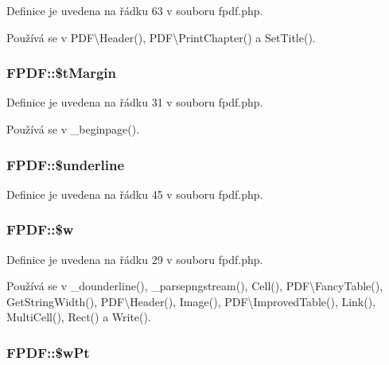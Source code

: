 Definice je uvedena na řádku 63 v souboru fpdf.\-php.



Používá se v P\-D\-F\textbackslash{}\-Header(), P\-D\-F\textbackslash{}\-Print\-Chapter() a Set\-Title().

\hypertarget{class_f_p_d_f_a89d24fb15623f31293ef11860ec53a77}{
\subsubsection[{\$t\-Margin}]{\setlength{\rightskip}{0pt plus 5cm}F\-P\-D\-F\-::\$t\-Margin}}\label{class_f_p_d_f_a89d24fb15623f31293ef11860ec53a77}


Definice je uvedena na řádku 31 v souboru fpdf.\-php.



Používá se v \-\_\-beginpage().

\hypertarget{class_f_p_d_f_a2d65d65ac5a4d1f173a2d61bfc7ca621}{
\subsubsection[{\$underline}]{\setlength{\rightskip}{0pt plus 5cm}F\-P\-D\-F\-::\$underline}}\label{class_f_p_d_f_a2d65d65ac5a4d1f173a2d61bfc7ca621}


Definice je uvedena na řádku 45 v souboru fpdf.\-php.

\hypertarget{class_f_p_d_f_adcb78dac68c4b261fab2a9c03de77177}{
\subsubsection[{\$w}]{\setlength{\rightskip}{0pt plus 5cm}F\-P\-D\-F\-::\$w}}\label{class_f_p_d_f_adcb78dac68c4b261fab2a9c03de77177}


Definice je uvedena na řádku 29 v souboru fpdf.\-php.



Používá se v \-\_\-dounderline(), \-\_\-parsepngstream(), Cell(), P\-D\-F\textbackslash{}\-Fancy\-Table(), Get\-String\-Width(), P\-D\-F\textbackslash{}\-Header(), Image(), P\-D\-F\textbackslash{}\-Improved\-Table(), Link(), Multi\-Cell(), Rect() a Write().

\hypertarget{class_f_p_d_f_a7b22f93934a55c4d60d730ae69d94b6c}{
\subsubsection[{\$w\-Pt}]{\setlength{\rightskip}{0pt plus 5cm}F\-P\-D\-F\-::\$w\-Pt}}\label{class_f_p_d_f_a7b22f93934a55c4d60d730ae69d94b6c}



